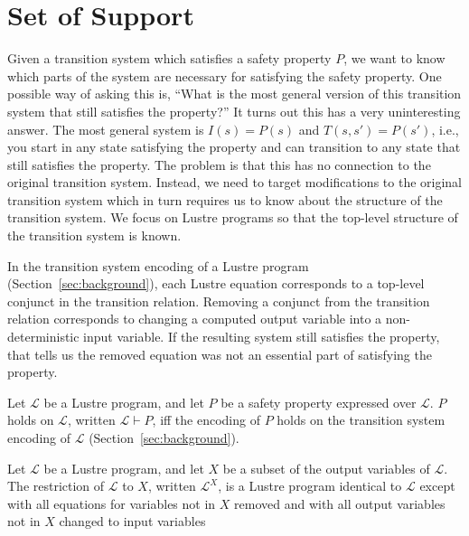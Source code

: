 \section{Set of Support}
\label{sec:support}

\newcommand{\rest}[2]{#1^{#2}}

Given a transition system which satisfies a safety property $P$, we
want to know which parts of the system are necessary for satisfying
the safety property. One possible way of asking this is, ``What is the
most general version of this transition system that still satisfies
the property?'' It turns out this has a very uninteresting answer. The
most general system is $I(s) = P(s)$ and $T(s, s') = P(s')$, i.e., you
start in any state satisfying the property and can transition to any
state that still satisfies the property. The problem is that this has
no connection to the original transition system. Instead, we need to
target modifications to the original transition system which in turn
requires us to know about the structure of the transition system. We
focus on Lustre programs so that the top-level structure of the
transition system is known.

In the transition system encoding of a Lustre program
(Section~\ref{sec:background}), each Lustre equation corresponds to a
top-level conjunct in the transition relation. Removing a conjunct
from the transition relation corresponds to changing a computed output
variable into a non-deterministic input variable. If the resulting
system still satisfies the property, that tells us the removed
equation was not an essential part of satisfying the property.

\begin{definition}
  \label{def:holds}
  Let $\mathcal{L}$ be a Lustre program, and let $P$ be a safety
  property expressed over $\mathcal{L}$. $P$ holds on $\mathcal{L}$,
  written $\mathcal{L} \vdash P$, iff the encoding of $P$ holds on the
  transition system encoding of $\mathcal{L}$
  (Section~\ref{sec:background}).
\end{definition}

\begin{definition}[Restriction]
  \label{def:restriction}
  Let $\mathcal{L}$ be a Lustre program, and let $X$ be a subset of
  the output variables of $\mathcal{L}$. The restriction of
  $\mathcal{L}$ to $X$, written $\rest{\mathcal{L}}{X}$, is a Lustre
  program identical to $\mathcal{L}$ except with all equations for
  variables not in $X$ removed and with all output variables not in
  $X$ changed to input variables
\end{definition}

